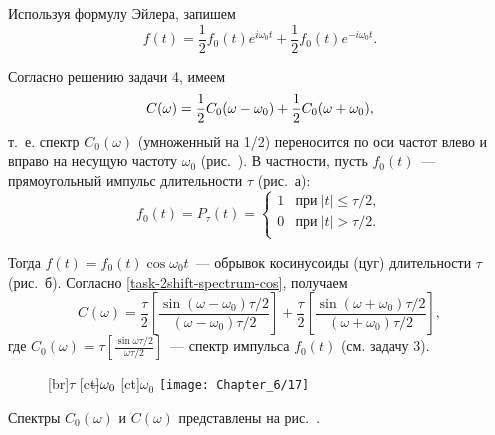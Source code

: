 Используя формулу Эйлера, запишем
\begin{equation*}
	f(t)=\frac{1}{2}f_0(t)e^{i\omega_0t}+\frac{1}{2}f_0(t)e^{-i\omega_0t}.
\end{equation*}

Согласно решению задачи 4, имеем
\begin{equation}
	\eqmark{task-2shift-spectrum-cos}
	C(\omega)=\frac{1}{2}C_0(\omega-\omega_0)+\frac{1}{2}C_0(\omega+\omega_0),
\end{equation}
т.~е. спектр $C_0(\omega)$ (умноженный на 1/2) переносится по оси частот влево и вправо на несущую частоту $\omega_0$
(рис.~). В частности, пусть $f_0(t)$~--- прямоугольный импульс длительности $\tau$ (рис.~а):
\begin{equation*}
	f_0(t)=P_{\tau}(t)=
	\begin{cases}
		1 & \text{при}~|t|\le\tau/2,\\
		0 & \text{при}~|t|>\tau/2.\\
	\end{cases}
\end{equation*}

Тогда $f(t)=f_0(t)\cos\omega_0 t$~--- обрывок косинусоиды (цуг) длительности $\tau$ (рис.~б). Согласно \eqref{task-2shift-spectrum-cos},
получаем
\begin{equation*}
	C(\omega)=\frac{\tau}{2}\left[\frac{\sin(\omega-\omega_0)\tau/2}{(\omega-\omega_0)\tau/2}\right]+
\frac{\tau}{2}\left[\frac{\sin(\omega+\omega_0)\tau/2}{(\omega+\omega_0)\tau/2}\right],
\end{equation*}
где $C_0(\omega)=\tau\left[\frac{\sin\omega\tau/2}{\omega\tau/2}\right]$~--- спектр импульса $f_0(t)$ (см. задачу 3).

\begin{figure}
	[br]{$\tau$}
	[ct]{$\llap{$-$}\omega_0$}
	[ct]{$\omega_0$}
	\texttt{[image: Chapter\_6/17]}
	\caption{}
\end{figure}

Спектры $C_0(\omega)$ и $C(\omega)$ представлены на рис.~.


